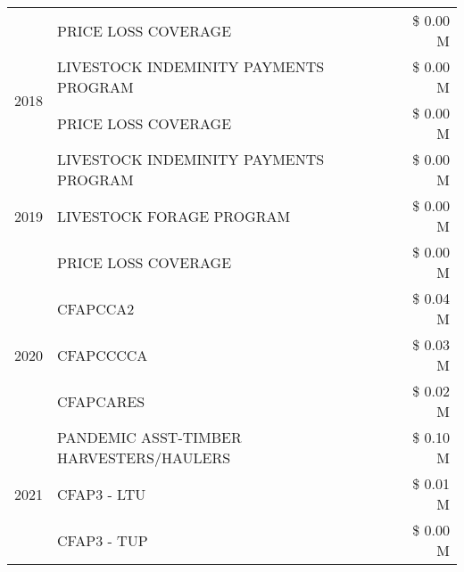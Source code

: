 \begin{tabular}{llr}
 & PRICE LOSS COVERAGE & \$ 0.00 M \\
\cline{1-3}
\multirow[t]{2}{*}{2018} & LIVESTOCK INDEMINITY PAYMENTS PROGRAM & \$ 0.00 M \\
 & PRICE LOSS COVERAGE & \$ 0.00 M \\
\cline{1-3}
\multirow[t]{3}{*}{2019} & LIVESTOCK INDEMINITY PAYMENTS PROGRAM & \$ 0.00 M \\
 & LIVESTOCK FORAGE PROGRAM & \$ 0.00 M \\
 & PRICE LOSS COVERAGE & \$ 0.00 M \\
\cline{1-3}
\multirow[t]{3}{*}{2020} & CFAPCCA2 & \$ 0.04 M \\
 & CFAPCCCCA & \$ 0.03 M \\
 & CFAPCARES & \$ 0.02 M \\
\cline{1-3}
\multirow[t]{3}{*}{2021} & PANDEMIC ASST-TIMBER HARVESTERS/HAULERS & \$ 0.10 M \\
 & CFAP3 - LTU & \$ 0.01 M \\
 & CFAP3 - TUP & \$ 0.00 M \\
\cline{1-3}
\bottomrule
\end{tabular}
